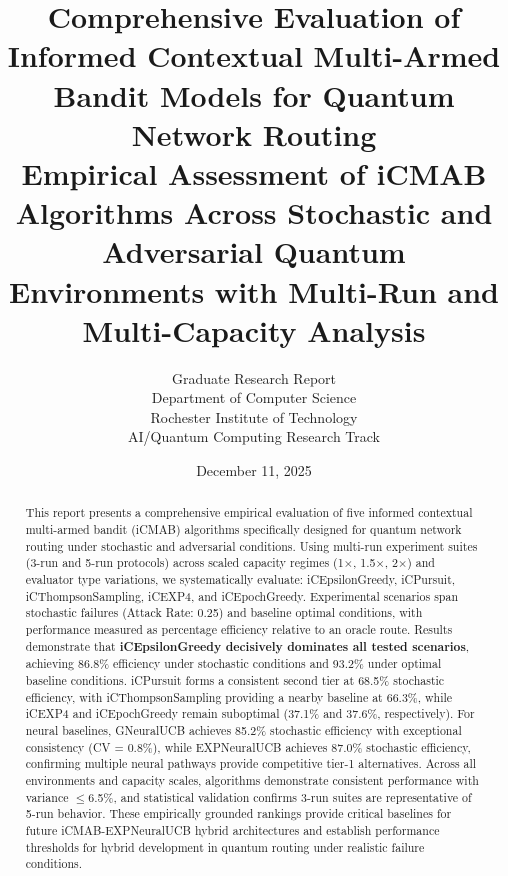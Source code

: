 \documentclass[12pt,a4paper]{article}
\title{\textbf{Comprehensive Evaluation of Informed Contextual Multi-Armed Bandit Models for Quantum Network Routing}\\
\large{Empirical Assessment of iCMAB Algorithms Across Stochastic and Adversarial Quantum Environments with Multi-Run and Multi-Capacity Analysis}}
\author{Graduate Research Report\\
Department of Computer Science\\
Rochester Institute of Technology\\
AI/Quantum Computing Research Track}
\date{December 11, 2025}
\newcommand{\primarytext}[1]{\textcolor{primaryblue}{\textbf{#1}}}
\begin{document}
\maketitle

\begin{abstract}
This report presents a comprehensive empirical evaluation of five informed contextual multi-armed bandit (iCMAB) algorithms specifically designed for quantum network routing under stochastic and adversarial conditions. Using multi-run experiment suites (3-run and 5-run protocols) across scaled capacity regimes (1$\times$, 1.5$\times$, 2$\times$) and evaluator type variations, we systematically evaluate: iCEpsilonGreedy, iCPursuit, iCThompsonSampling, iCEXP4, and iCEpochGreedy. Experimental scenarios span stochastic failures (Attack Rate: 0.25) and baseline optimal conditions, with performance measured as percentage efficiency relative to an oracle route. Results demonstrate that \primarytext{iCEpsilonGreedy decisively dominates all tested scenarios}, achieving 86.8\% efficiency under stochastic conditions and 93.2\% under optimal baseline conditions. iCPursuit forms a consistent second tier at 68.5\% stochastic efficiency, with iCThompsonSampling providing a nearby baseline at 66.3\%, while iCEXP4 and iCEpochGreedy remain suboptimal (37.1\% and 37.6\%, respectively). For neural baselines, GNeuralUCB achieves 85.2\% stochastic efficiency with exceptional consistency (CV = 0.8\%), while EXPNeuralUCB achieves 87.0\% stochastic efficiency, confirming multiple neural pathways provide competitive tier-1 alternatives. Across all environments and capacity scales, algorithms demonstrate consistent performance with variance $\leq$6.5\%, and statistical validation confirms 3-run suites are representative of 5-run behavior. These empirically grounded rankings provide critical baselines for future iCMAB-EXPNeuralUCB hybrid architectures and establish performance thresholds for hybrid development in quantum routing under realistic failure conditions.
\end{abstract}

\newpage
\tableofcontents

\newpage
\end{document}
